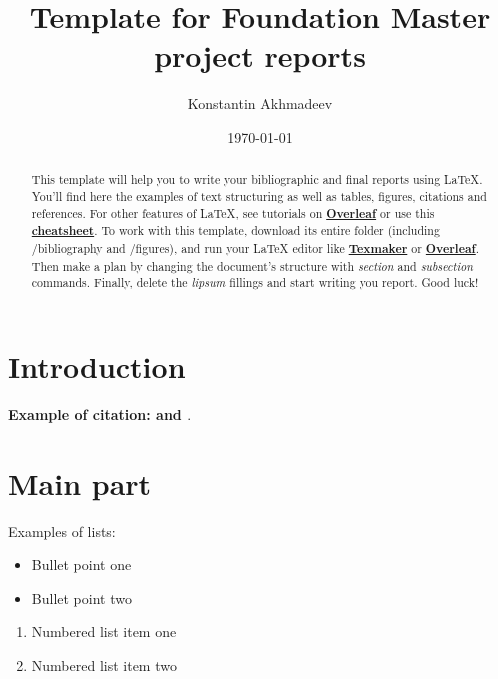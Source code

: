 \documentclass[12pt]{article}
\begin{document}
\title{Template for Foundation Master project reports} %
\author{Konstantin Akhmadeev}
\date{\today} %
\maketitle %



\begin{abstract}
This template will help you to write your bibliographic and final reports using \LaTeX{}. You'll find here the examples of text structuring as well as tables, figures, citations and references. For other features of \LaTeX, see tutorials on \href{https://www.overleaf.com/learn}{\textbf{Overleaf}} or use this \href{https://wch.github.io/latexsheet/}{\textbf{cheatsheet}}. To work with this template, download its entire folder (including /bibliography and /figures), and run your \LaTeX{}  editor like \href{http://www.xm1math.net/texmaker/}{\textbf{Texmaker}} or \href{https://www.overleaf.com}{\textbf{Overleaf}}. Then make a plan by changing the document's structure with \textit{section} and \textit{subsection} commands. Finally, delete the \textit{lipsum} fillings and start writing you report. Good luck!
\end{abstract}


\section{Introduction}

\textbf{Example of citation: \cite{Smith_2013} and \cite{Smith_2012}}. \lipsum[2]

\section{Main part}
\label{S:1}

Examples of lists:
\begin{itemize}
\item Bullet point one
\item Bullet point two
\end{itemize}

\begin{enumerate}
\item Numbered list item one
\item Numbered list item two
\end{enumerate}
\end{document}
